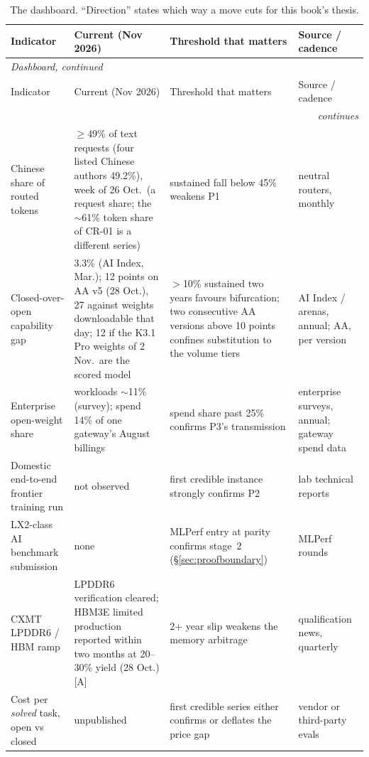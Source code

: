 \begin{small}
\begin{longtable}{p{40mm}p{24mm}p{34mm}p{40mm}}
  \caption{The dashboard. ``Direction'' states which way a move cuts for this book's thesis.}
  \label{tab:dashboard} \\
  \toprule
  Indicator & Current (Nov 2026) & Threshold that matters & Source / cadence \\
  \midrule
  \endfirsthead
  \multicolumn{4}{l}{\footnotesize\emph{Dashboard, continued}} \\
  \toprule
  Indicator & Current (Nov 2026) & Threshold that matters & Source / cadence \\
  \midrule
  \endhead
  \midrule
  \multicolumn{4}{r}{\footnotesize\emph{continues}} \\
  \endfoot
  \bottomrule
  \endlastfoot
    Chinese share of routed tokens & $\geq$49\% of text requests (four listed Chinese authors 49.2\%), week of 26 Oct.\ (a request share; the $\sim$61\% token share of CR-01 is a different series) & sustained fall below 45\% weakens P1 & neutral routers, monthly \\
    \addlinespace
    Closed-over-open capability gap & 3.3\% (AI Index, Mar.); 12 points on AA v5 (28 Oct.), 27 against weights downloadable that day; 12 if the K3.1 Pro weights of 2 Nov.\ are the scored model & $>$10\% sustained two years favours bifurcation; two consecutive AA versions above 10 points confines substitution to the volume tiers & AI Index / arenas, annual; AA, per version \\
    \addlinespace
    Enterprise open-weight share & workloads $\sim$11\% (survey); spend 14\% of one gateway's August billings & spend share past 25\% confirms P3's transmission & enterprise surveys, annual; gateway spend data \\
    \addlinespace
    Domestic end-to-end frontier training run & not observed & first credible instance strongly confirms P2 & lab technical reports \\
    \addlinespace
    LX2-class AI benchmark submission & none & MLPerf entry at parity confirms stage~2 (\S\ref{sec:proofboundary}) & MLPerf rounds \\
    \addlinespace
    CXMT LPDDR6 / HBM ramp & LPDDR6 verification cleared; HBM3E limited production reported within two months at 20--30\% yield (28 Oct.) [A] & 2+ year slip weakens the memory arbitrage & qualification news, quarterly \\
    \addlinespace
    Cost per \emph{solved} task, open vs closed & unpublished & first credible series either confirms or deflates the price gap & vendor or third-party evals \\

\end{longtable}
\end{small}
